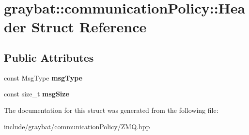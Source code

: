\hypertarget{structgraybat_1_1communicationPolicy_1_1Header}{}\section{graybat\+:\+:communication\+Policy\+:\+:Header Struct Reference}
\label{structgraybat_1_1communicationPolicy_1_1Header}
\subsection*{Public Attributes}
\begin{DoxyCompactItemize}
\item 
\hypertarget{structgraybat_1_1communicationPolicy_1_1Header_a397d84d0b4e5c698d34acc817f27abab}{}const Msg\+Type {\bfseries msg\+Type}\label{structgraybat_1_1communicationPolicy_1_1Header_a397d84d0b4e5c698d34acc817f27abab}

\item 
\hypertarget{structgraybat_1_1communicationPolicy_1_1Header_a4f995cab4e59e5c161aab9d3247007c5}{}const size\+\_\+t {\bfseries msg\+Size}\label{structgraybat_1_1communicationPolicy_1_1Header_a4f995cab4e59e5c161aab9d3247007c5}

\end{DoxyCompactItemize}


The documentation for this struct was generated from the following file\+:\begin{DoxyCompactItemize}
\item 
include/graybat/communication\+Policy/Z\+M\+Q.\+hpp\end{DoxyCompactItemize}
